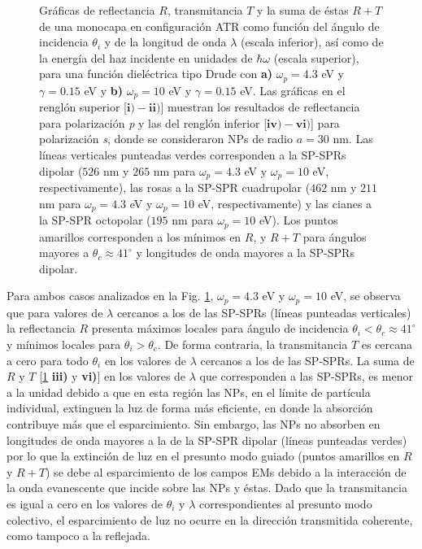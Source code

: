 \begin{figure}[h!]
\begin{subfigure}{.7\linewidth}
		\end{subfigure}\vspace*{-.7em}
	\caption{Gráficas de reflectancia $R$, transmitancia $T$ y la suma de éstas $R+T$ de una monocapa en configuración ATR como función del ángulo de incidencia $\theta_i$ y de la longitud de onda $\lambda$ (escala inferior), así como de la energía del haz incidente en unidades de $\hbar\omega$ (escala superior), para una función dieléctrica tipo Drude con \textbf{a)} $\omega_p=4. 3$ eV  y  $\gamma=0. 15$ eV y \textbf{b)} $\omega_p = 10$ eV y $\gamma = 0.15$ eV.  Las gráficas   en el renglón superior [$\mathbf{i)-ii)}$]  muestran los resultados de reflectancia para  polarización \emph{p} y las del renglón inferior  [$\mathbf{iv)-vi)}$] para polarización  \emph{s}, donde se consideraron NPs de radio $a=30$ nm. Las líneas verticales punteadas verdes corresponden a la SP-SPRs dipolar ($526$ nm y $265$ nm para $\omega_p=4.3$ eV y $\omega_p = 10$ eV, respectivamente), las rosas a la SP-SPR cuadrupolar ($462$ nm y $211$ nm para $\omega_p=4.3$ eV y $\omega_p = 10$ eV, respectivamente) y las cianes a la SP-SPR octopolar ($195$ nm para $\omega_p = 10$ eV). Los puntos amarillos corresponden a los mínimos en $R$, y $R+T$ para ángulos mayores a $\theta_c\approx 41^\circ$ y longitudes de onda mayores a la SP-SPRs dipolar. }\label{fig:RT-Omegas}
	\end{figure}	

Para ambos casos analizados en la Fig. \ref{fig:RT-Omegas}, $\omega_p = 4.3$ eV y $\omega_p = 10$ eV, se observa que para valores de $\lambda$ cercanos a los de las SP-SPRs (líneas punteadas verticales) la reflectancia $R$ presenta máximos locales para ángulo de incidencia $\theta_i<\theta_c \approx 41^\circ$ y mínimos locales para $\theta_i>\theta_c$. De forma contraria, la transmitancia $T$ es cercana a cero para todo $\theta_i$ en los valores de $\lambda$ cercanos a los de las SP-SPRs. La suma de $R$ y $T$ [\ref{fig:RT-Omegas} \textbf{iii)} y \textbf{vi)}] en los valores de $\lambda$ que corresponden a las SP-SPRs, es menor a la unidad debido a que en esta región las NPs, en el límite de partícula individual, extinguen la luz de forma más eficiente, en donde la absorción contribuye más que el esparcimiento. Sin embargo, las NPs no absorben en longitudes de onda mayores a la de la SP-SPR dipolar (líneas punteadas verdes) por lo que la extinción de luz en el presunto modo guiado (puntos amarillos en $R$ y $R+T$) se debe al esparcimiento de los campos EMs debido a la interacción de la onda evanescente que incide sobre las NPs y éstas. Dado que la transmitancia es igual a cero en los valores de $\theta_i$ y $\lambda$ correspondientes al presunto modo colectivo, el esparcimiento de luz no ocurre en la dirección transmitida coherente, como tampoco a la reflejada. 


